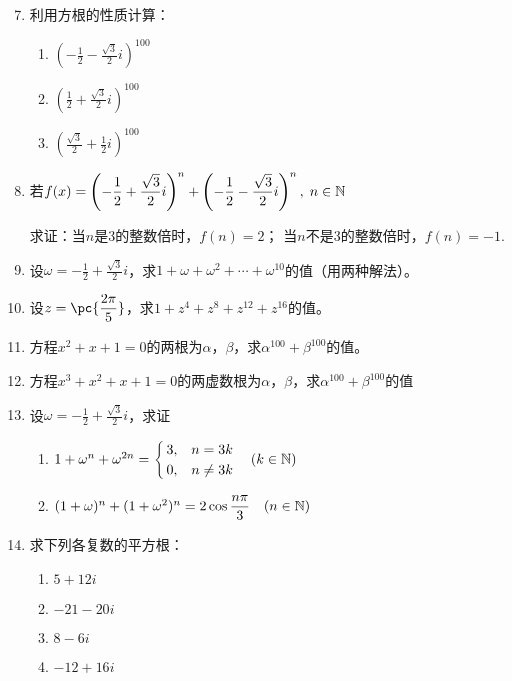 \begin{enumerate}\setcounter{enumi}{6}
    \item 利用方根的性质计算：
\begin{multicols}{3}
\begin{enumerate}[(1)]
    \item $\left(-\frac{1}{2}-\frac{\sqrt{3}}{2}i\right)^{100}$
    \item $\left(\frac{1}{2}+\frac{\sqrt{3}}{2}i\right)^{100}$
    \item $\left(\frac{\sqrt{3}}{2}+\frac{1}{2}i\right)^{100}$
\end{enumerate}
\end{multicols}
\item 若$f(x)=\left(-\dfrac{1}{2}+\dfrac{\sqrt{3}}{2}i\right)^n+\left(-\dfrac{1}{2}-\dfrac{\sqrt{3}}{2}i\right)^n,\; n\in\mathbb{N}$

求证：当$n$是3的整数倍时，$f(n)=2$；
当$n$不是3的整数倍时，$f(n)=-1$.
\item 设$\omega=-\frac{1}{2}+\frac{\sqrt{3}}{2}i$，求$1+\omega+\omega^2+\cdots+\omega^{10}$的值（用两种解法）。
\item 设$z=\pc{\frac{2\pi}{5}}$，求$1+z^4+z^8+z^{12}+z^{16}$的值。
\item  方程$x^2+x+1=0$的两根为$\alpha$，$\beta$，求$\alpha^{100}+\beta^{100}$的值。
\item 方程$x^3+x^2+x+1=0$的两虚数根为$\alpha$，$\beta$，求$\alpha^{100}+\beta^{100}$的值
\item 设$\omega=-\frac{1}{2}+\frac{\sqrt{3}}{2}i$，求证
\begin{enumerate}[(1)]
    \item $1+\omega^n+\omega^{2n}=\begin{cases}
        3,& n=3k\\
        0,& n\ne 3k
    \end{cases}\quad (k\in\mathbb{N})$
\item $(1+\omega)^n+(1+\omega^2)^n=2\cos\dfrac{n\pi}{3}\quad (n\in\mathbb{N})$
\end{enumerate}

\item 求下列各复数的平方根：
\begin{multicols}{2}
\begin{enumerate}[(1)]
    \item $5+12i$
    \item $-21-20i$
    \item $8-6i$
    \item $-12+16i$
\end{enumerate}
\end{multicols}
\end{enumerate}

